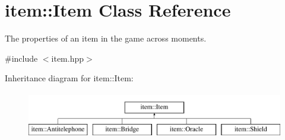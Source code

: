 \hypertarget{classitem_1_1_item}{}\section{item\+:\+:Item Class Reference}
\label{classitem_1_1_item}


The properties of an item in the game across moments.  




{\ttfamily \#include $<$item.\+hpp$>$}

Inheritance diagram for item\+:\+:Item\+:\begin{figure}[H]
\begin{center}
\leavevmode
\includegraphics[height=2.000000cm]{classitem_1_1_item}
\end{center}
\end{figure}
